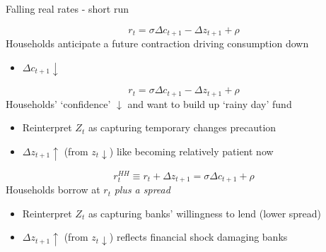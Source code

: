\begin{frame}{Falling real rates - short run}

\[
r_{t} = \sigma \Delta c_{t+1} - \Delta z_{t+1} + \rho
\]
Households anticipate a future contraction driving consumption down
\begin{itemize}
\item	$\Delta c_{t+1}\downarrow$
\end{itemize}
\[
r_{t} = \sigma \Delta c_{t+1} - \Delta z_{t+1} + \rho
\]
Households' `confidence' $\downarrow$ and want to build up `rainy day' fund
\begin{itemize}
\item	Reinterpret $Z_{t}$ as capturing temporary changes precaution
\item	$\Delta z_{t+1} \uparrow$ (from $z_{t}\downarrow$) like becoming relatively patient now
\end{itemize}
\vspace{1.5mm}
\[
r_{t}^{HH} \equiv r_{t} + \Delta z_{t+1} = \sigma \Delta c_{t+1} + \rho
\]
Households borrow at $r_{t}$ \textit{plus a spread}
\begin{itemize}
\item	Reinterpret $Z_{t}$ as capturing banks' willingness to lend (lower spread)
\item	$\Delta z_{t+1} \uparrow$ (from $z_{t}\downarrow$) reflects financial shock damaging banks
\end{itemize}

\end{frame}


	
